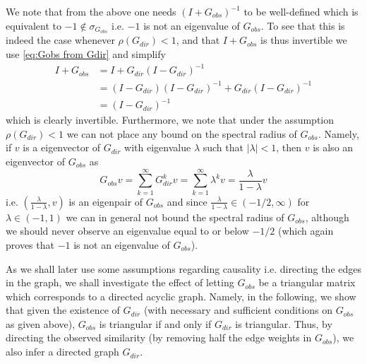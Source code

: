 \documentclass[../Thesis.tex]{subfiles}
\begin{document}
We note that from the above one needs $\left( I + G_{obs}\right)^{-1}$ to be well-defined which is equivalent to $-1 \not\in \sigma_{G_{obs}}$ i.e. $-1$ is not an eigenvalue of $G_{obs}$. To see that this is indeed the case whenever $\rho\left(G_{dir}\right) < 1$, and that $I + G_{obs}$ is thus invertible we use \autoref{eq:Gobs from Gdir} and simplify
\begin{align*}
    I + G_{obs} & = I + G_{dir} \left(I-G_{dir}\right)^{-1}                                                \\
                & = \left(I-G_{dir}\right)\left(I-G_{dir}\right)^{-1} + G_{dir}\left(I-G_{dir}\right)^{-1} \\
                & = \left(I-G_{dir}\right)^{-1}
\end{align*}
which is clearly invertible. Furthermore, we note that under the assumption $\rho\left(G_{dir}\right) < 1$ we can not place any bound on the spectral radius of $G_{obs}$. Namely, if $v$ is a eigenvector of $G_{dir}$ with eigenvalue $\lambda$ such that $|\lambda|<1$, then $v$ is also an eigenvector of $G_{obs}$ as
$$G_{obs} v = \sum_{k=1}^\infty G_{dir}^k v = \sum_{k=1}^\infty \lambda^k v = \frac{\lambda}{1-\lambda} v$$
i.e. $\left(\frac{\lambda}{1-\lambda},v\right)$ is an eigenpair of $G_{obs}$ and since $\frac{\lambda}{1-\lambda} \in (-1/2, \infty)$ for $\lambda\in (-1,1)$ we can in general not bound the spectral radius of $G_{obs}$, although we should never observe an eigenvalue equal to or below $-1/2$ (which again proves that $-1$ is not an eigenvalue of $G_{obs}$).

As we shall later use some assumptions regarding causality i.e. directing the edges in the graph, we shall investigate the effect of letting $G_{obs}$ be a triangular matrix which corresponds to a directed acyclic graph. Namely, in the following, we show that given the existence of $G_{dir}$ (with necessary and sufficient conditions on $G_{obs}$ as given above), $G_{obs}$ is triangular if and only if $G_{dir}$ is triangular. Thus, by directing the observed similarity (by removing half the edge weights in $G_{obs}$), we also infer a directed graph $G_{dir}$.
\end{document}
